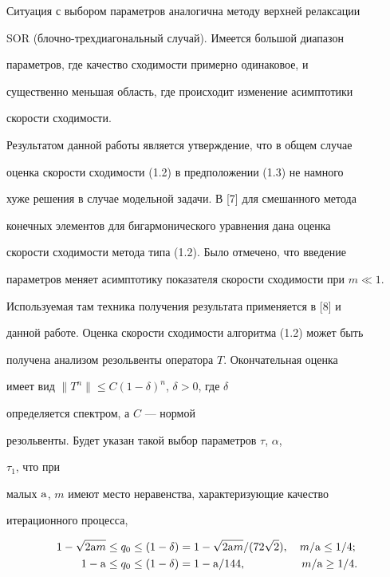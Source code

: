 Ситуация с выбором параметров аналогична методу верхней релаксации 


SOR (блочно-трех\-диа\-го\-наль\-ный случай). Имеется большой диапазон 


параметров, где качество сходимости примерно одинаковое, и 


существенно меньшая область, где происходит изменение асимптотики 


скорости сходимости. 


 


Результатом данной работы является утверждение, что в общем случае 


оценка скорости сходимости (1.2) в предположении (1.3) не намного 


хуже решения в случае модельной задачи. В [7] для смешанного метода 


конечных элементов для бигармонического уравнения дана оценка 


скорости сходимости метода типа (1.2). Было отмечено, что введение 


параметров меняет асимптотику показателя скорости сходимости при $m\ll1$. 


Используемая там техника получения результата применяется в [8] и 


данной работе. Оценка скорости сходимости алгоритма (1.2) может быть 


получена анализом резольвенты оператора $T$. Окончательная оценка 


имеет вид $\|T^n\|\le C(1-\delta)^n$, $\delta>0$, где $\delta$ 


определяется спектром, а $C$ --- нормой 


резольвенты. Будет указан такой выбор параметров $\tau$, $\alpha$, 


$\tau_1$, что при 


малых $\mathrm a$, $m$ имеют место неравенства, характеризующие качество 


итерационного процесса, 


\begin{equation} 


\begin{split} 


1-\sqrt{2\A m}&\le q_0\le(1-\delta)=1-\sqrt{2\A m}/ 


(72\sqrt{2}),\quad m/\A\le 1/4; \\ 


% 


1-\A&\le q_0\le(1-\delta)=1-\A/144, \quad \qquad\qquad m/\A\ge 1/4. 


\end{split} 


\end{equation} 


